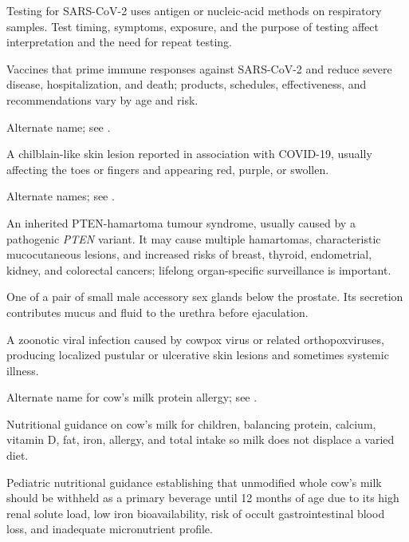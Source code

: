  Testing for SARS-CoV-2 uses antigen or nucleic-acid methods on respiratory samples. Test timing, symptoms, exposure, and the purpose of testing affect interpretation and the need for repeat testing.


 Vaccines that prime immune responses against SARS-CoV-2 and reduce severe disease, hospitalization, and death; products, schedules, effectiveness, and recommendations vary by age and risk.

 Alternate name; see .

 A chilblain-like skin lesion reported in association with COVID-19, usually affecting
the toes or fingers and appearing red, purple, or swollen.

 Alternate names; see .

 An inherited PTEN-hamartoma tumour syndrome, usually caused by a pathogenic \textit{PTEN} variant. It may cause multiple hamartomas, characteristic mucocutaneous lesions, and increased risks of breast, thyroid, endometrial, kidney, and colorectal cancers; lifelong organ-specific surveillance is important.

 One of a pair of small male accessory sex glands below the prostate. Its secretion
contributes mucus and fluid to the urethra before ejaculation.

 A zoonotic viral infection caused by cowpox virus or related orthopoxviruses, producing
localized pustular or ulcerative skin lesions and sometimes systemic illness.

 Alternate name for cow's milk protein allergy; see .

 Nutritional guidance on cow’s milk for children, balancing protein, calcium, vitamin D, fat, iron, allergy, and total intake so milk does not displace a varied diet.

 Pediatric nutritional guidance establishing that unmodified whole cow's milk should be withheld as a primary beverage until 12 months of age due to its high renal solute load, low iron bioavailability, risk of occult gastrointestinal blood loss, and inadequate micronutrient profile.

